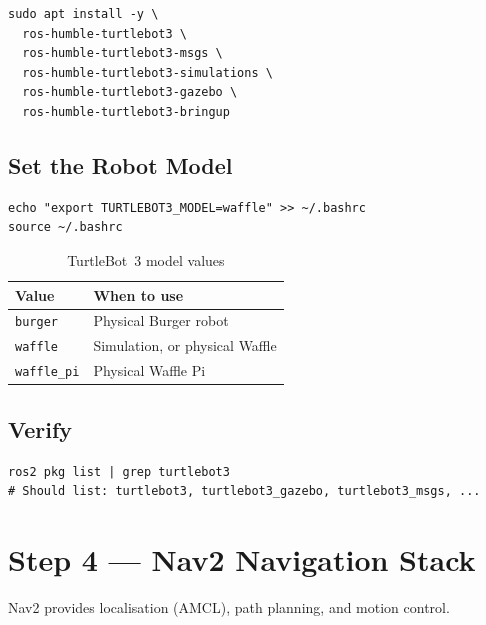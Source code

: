 \documentclass[12pt,a4paper]{report}
\begin{document}
\begin{lstlisting}[style=bashstyle, caption={Install TurtleBot~3 apt packages}]
sudo apt install -y \
  ros-humble-turtlebot3 \
  ros-humble-turtlebot3-msgs \
  ros-humble-turtlebot3-simulations \
  ros-humble-turtlebot3-gazebo \
  ros-humble-turtlebot3-bringup
\end{lstlisting}

\subsection{Set the Robot Model}

\begin{lstlisting}[style=bashstyle, caption={Export the robot model}]
echo "export TURTLEBOT3_MODEL=waffle" >> ~/.bashrc
source ~/.bashrc
\end{lstlisting}

\begin{table}[H]
  \centering
  \caption{TurtleBot~3 model values}
  \begin{tabular}{ll}
    \toprule
    \textbf{Value} & \textbf{When to use} \\
    \midrule
    \texttt{burger}    & Physical Burger robot \\
    \texttt{waffle}    & Simulation, or physical Waffle \\
    \texttt{waffle\_pi} & Physical Waffle Pi \\
    \bottomrule
  \end{tabular}
\end{table}

\subsection{Verify}

\begin{lstlisting}[style=bashstyle]
ros2 pkg list | grep turtlebot3
# Should list: turtlebot3, turtlebot3_gazebo, turtlebot3_msgs, ...
\end{lstlisting}

\section{Step 4 --- Nav2 Navigation Stack}

Nav2 provides localisation (AMCL), path planning, and motion control.
\end{document}
